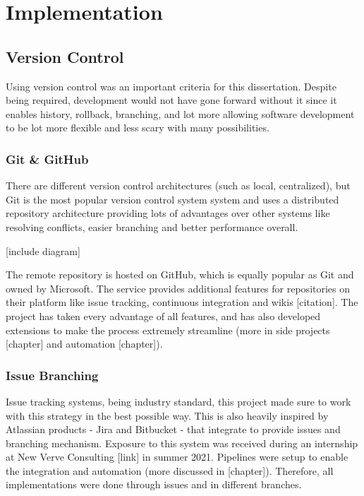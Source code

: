 \documentclass{l4proj}
\begin{document}
\chapter{Implementation}

\section{Version Control}

Using version control was an important criteria for this dissertation. Despite being required, development would not have gone forward without it since it enables history, rollback, branching, and lot more allowing software development to be lot more flexible and less scary with many possibilities.

\subsection{Git \& GitHub}

There are different version control architectures (such as local, centralized), but Git is the most popular version control system system and uses a distributed repository architecture providing lots of advantages over other systems like resolving conflicts, easier branching and better performance overall.

[include diagram]

The remote repository is hosted on GitHub, which is equally popular as Git and owned by Microsoft. The service provides additional features for repositories on their platform like issue tracking, continuous integration and wikis [citation]. The project has taken every advantage of all features, and has also developed extensions to make the process extremely streamline (more in side projects [chapter] and automation [chapter]).

\subsection{Issue Branching}

Issue tracking systems, being industry standard, this project made sure to work with this strategy in the best possible way. This is also heavily inspired by Atlassian products - Jira and Bitbucket - that integrate to provide issues and branching mechanism. Exposure to this system was received during an internship at New Verve Consulting [link] in summer 2021. Pipelines were setup to enable the integration and automation (more discussed in [chapter]). Therefore, all implementations were done through issues and in different branches.
\end{document}
